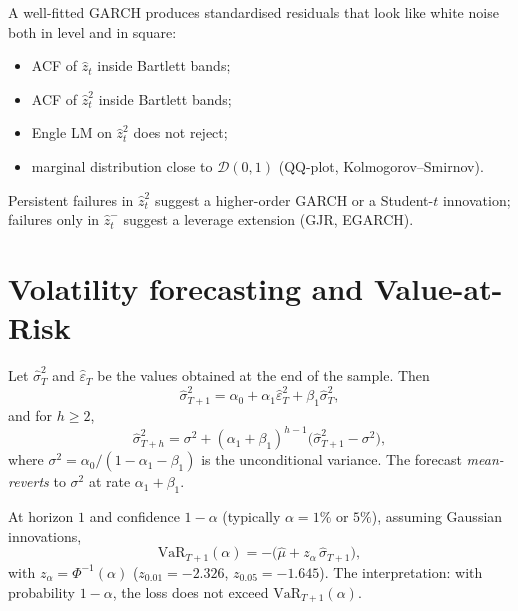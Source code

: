 \begin{rembox}
A well-fitted GARCH produces standardised residuals that look like
white noise both in level and in square:
\begin{itemize}
  \item ACF of $\widehat z_t$ inside Bartlett bands;
  \item ACF of $\widehat z_t^2$ inside Bartlett bands;
  \item Engle LM on $\widehat z_t^2$ does not reject;
  \item marginal distribution close to $\mathcal D(0, 1)$ (QQ-plot,
        Kolmogorov--Smirnov).
\end{itemize}
Persistent failures in $\widehat z_t^2$ suggest a higher-order GARCH
or a Student-$t$ innovation; failures only in $\widehat z_t^-$
suggest a leverage extension (GJR, EGARCH).
\end{rembox}

\section{Volatility forecasting and Value-at-Risk}
\label{sec:garch-forecast}

\begin{propbox}
\label{prop:garch-forecast}
Let $\widehat\sigma_T^2$ and $\widehat\varepsilon_T$ be the values
obtained at the end of the sample. Then
\[
  \widehat\sigma_{T+1}^2
  = \alpha_0 + \alpha_1 \widehat\varepsilon_T^2
             + \beta_1 \widehat\sigma_T^2,
\]
and for $h \geq 2$,
\[
  \widehat\sigma_{T+h}^2
  = \sigma^2
  + (\alpha_1 + \beta_1)^{h-1}
        \bigl(\widehat\sigma_{T+1}^2 - \sigma^2\bigr),
\]
where $\sigma^2 = \alpha_0 / (1 - \alpha_1 - \beta_1)$ is the
unconditional variance. The forecast \emph{mean-reverts} to
$\sigma^2$ at rate $\alpha_1 + \beta_1$.
\end{propbox}

\begin{defbox}
\label{def:var}
At horizon $1$ and confidence $1 - \alpha$ (typically $\alpha = 1\%$
or $5\%$), assuming Gaussian innovations,
\[
  \mathrm{VaR}_{T+1}(\alpha)
  = -\bigl(\widehat\mu + z_\alpha\, \widehat\sigma_{T+1}\bigr),
\]
with $z_\alpha = \Phi^{-1}(\alpha)$ ($z_{0.01} = -2.326$,
$z_{0.05} = -1.645$). The interpretation: with probability
$1 - \alpha$, the loss does not exceed $\mathrm{VaR}_{T+1}(\alpha)$.
\end{defbox}

